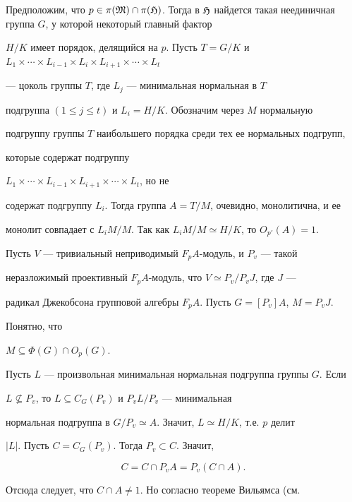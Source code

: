 \begin{pf} Предположим, что $p\in\pi(\frak M)\cap\pi(\frak H)$. Тогда в $\frak 


H$ найдется такая неединичная группа $G$, у которой некоторый главный фактор 


$H/K$ имеет порядок, делящийся на $p$. Пусть $T=G/K$ и $L_1\times\dotsb\times 


L_{i-1}\times L_i\times L_{i+1} 


\times\dotsb\times L_t$


--- цоколь группы $T$, где $L_j$ --- минимальная нормальная в $T$ 


подгруппа $(1\le j\le t)$ и $L_i=H/K$. Обозначим через $M$ нормальную 


подгруппу группы $T$ наибольшего порядка среди тех ее нормальных подгрупп, 


которые содержат подгруппу


$L_1\times\dotsb\times L_{i-1}\times L_{i+1}\times\dotsb\times L_t$, но не 


содержат подгруппу $L_i$. Тогда группа $A=T/M$, очевидно, монолитична, и ее 


монолит совпадает с $L_iM/M$. Так как $L_iM/M\simeq H/K$, то $O_{p'}(A)=1$. 


 


Пусть $V$ --- тривиальный неприводимый $F_pA$-модуль, и $P_v$ --- такой 


неразложимый проективный $F_pA$-модуль, что $V\simeq P_v/P_vJ$, где $J$ --- 


радикал Джекобсона групповой алгебры $F_pA$. Пусть $G=[P_v]A$, $M=P_vJ$. 


Понятно, что 


$M\subseteq\Phi(G)\cap O_p(G)$. 


 


Пусть $L$ --- произвольная минимальная нормальная подгруппа группы $G$. Если 


$L\nsubseteq P_v$, то $L\subseteq C_G(P_v)$ и $P_vL/P_v$ --- минимальная 


нормальная подгруппа в $G/P_v\simeq A$. Значит, $L\simeq H/K$, т.е. $p$ делит 


$|L|$. Пусть $C=C_G(P_v)$. Тогда $P_v\subset C$. Значит, 


$$ 


C=C\cap P_vA = P_v(C\cap A). 


$$ 


Отсюда следует, что $C\cap A \ne 1$. Но согласно теореме Вильямса (см. 



\end{pf}
